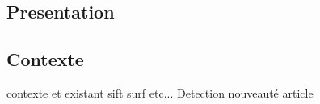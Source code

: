 \subsection{Presentation}

\subsection{Contexte}
contexte et existant sift surf etc...
Detection nouveauté article
